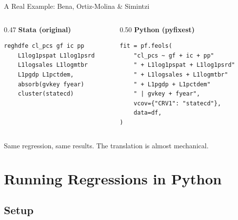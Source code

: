 \documentclass[9pt,aspectratio=169]{beamer}
\begin{document}
\begin{frame}[fragile]{A Real Example: Bena, Ortiz-Molina \& Simintzi}

\vspace{-0.3em}

\begin{columns}[T]
\begin{column}{0.47\textwidth}
\textbf{Stata (original)}
\begin{lstlisting}[style=stata,basicstyle=\ttfamily\scriptsize]
reghdfe cl_pcs gf ic pp
    L1log1pspat L1log1psrd
    L1logsales L1logmtbr
    L1pgdp L1pctdem,
    absorb(gvkey fyear)
    cluster(statecd)
\end{lstlisting}
\end{column}
\begin{column}{0.50\textwidth}
\textbf{Python (pyfixest)}
\begin{lstlisting}[basicstyle=\ttfamily\scriptsize]
fit = pf.feols(
    "cl_pcs ~ gf + ic + pp"
    " + L1log1pspat + L1log1psrd"
    " + L1logsales + L1logmtbr"
    " + L1pgdp + L1pctdem"
    " | gvkey + fyear",
    vcov={"CRV1": "statecd"},
    data=df,
)
\end{lstlisting}
\end{column}
\end{columns}

\medskip

\begin{highlightbox}
\centering
Same regression, same results. The translation is almost mechanical.
\end{highlightbox}

\end{frame}


\section{Running Regressions in Python}
\subsection{Setup}
\end{document}
